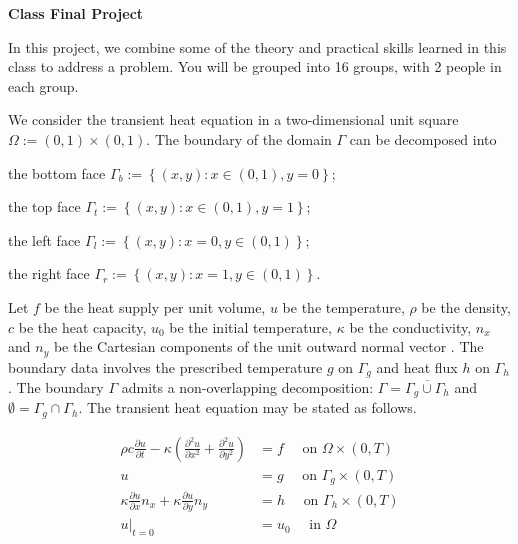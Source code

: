 \documentclass[12pt]{article}
\begin{document}
\begin{center}
\textbf{\Large
Class Final Project
}





\end{center}

In this project, we combine some of the theory and practical skills learned in this class to address a problem. You will be grouped into 16 groups, with 2 people in each group.

We consider the transient heat equation in a two-dimensional unit square $\Omega := (0,1)\times(0,1)$. The boundary of the domain $\Gamma$ can be decomposed into
\begin{description}
\item the bottom face $\Gamma_b := \left\lbrace (x,y) : x \in (0,1), y = 0 \right\rbrace$;
\item the top face $\Gamma_t := \left\lbrace (x,y) : x \in (0,1),  y = 1 \right\rbrace$;
\item the left face $\Gamma_l := \left\lbrace (x,y) : x=0, y \in (0,1) \right\rbrace$;
\item the right face $\Gamma_r := \left\lbrace (x,y) : x=1, y \in (0,1) \right\rbrace$.
\end{description}
Let $f$ be the heat supply per unit volume, $u$ be the temperature,  $\rho$ be the density, $c$ be the heat capacity, $u_0$ be the initial temperature, $\kappa$ be the conductivity, $n_x$ and $n_y$ be the Cartesian components of the unit outward normal vector . The boundary data involves the prescribed temperature $g$ on $\Gamma_g$ and heat flux $h$ on $\Gamma_h$. The boundary $\Gamma$ admits a non-overlapping decomposition: $\Gamma = \overline{\Gamma_{g} \cup \Gamma_h}$ and $\emptyset = \Gamma_g \cap \Gamma_h$. The transient heat equation may be stated as follows.

\begin{align*}
\rho c \frac{\partial u}{\partial t} - \kappa \left( \frac{\partial^2 u}{\partial x^2} + \frac{\partial^2 u}{\partial y^2} \right) &= f \quad \mbox{ on } \Omega \times (0,T) \\
u &= g \quad \mbox{ on } \Gamma_{g} \times (0,T) \\
\kappa \frac{\partial u}{\partial x} n_{x} + \kappa \frac{\partial u}{\partial y} n_{y} &= h \quad \mbox{ on } \Gamma_h \times (0,T) \\
u|_{t=0} &= u_0 \quad \mbox{ in } \Omega
\end{align*}
\end{document}
